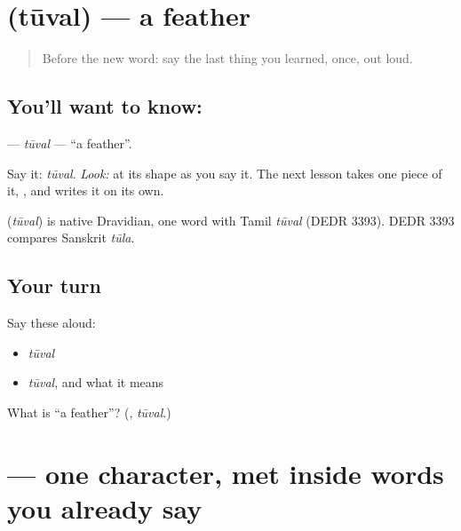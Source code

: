 \section[\texorpdfstring{\ml{തൂവൽ} (tūval)}{തൂവൽ (tūval)}]{ (tūval) — a feather}

\label{lesson:ML-C05-thooval}



\begin{quote}
Before the new word: say the last thing you learned, once, out loud.
\end{quote}

\subsection*{You'll want to know: }
\textbf{} — \emph{tūval} — \textquotedblleft{}a feather\textquotedblright{}.

Say it: \emph{tūval}. \emph{Look:} at its shape as you say it. The next lesson takes one piece of it, \textbf{}, and writes it on its own.

\begin{cousinweb}
\textbf{} (\emph{tūval}) is native Dravidian, one word with Tamil \emph{tūval} (DEDR 3393). DEDR 3393 compares Sanskrit \emph{tūla}.
\end{cousinweb}

\subsection*{Your turn}
Say these aloud:

\begin{itemize}
\raggedright
  \item \emph{tūval}
  \item \emph{tūval}, and what it means
\end{itemize}

\begin{tcolorbox}[breakable,colback=teal!4,colframe=teal!35!black,title={Before you move on}]
What is \textquotedblleft{}a feather\textquotedblright{}? (\textbf{}, \emph{tūval}.)
\end{tcolorbox}
\section[\texorpdfstring{\ml{ൽ} (l)}{ൽ (l)}]{ — one character, met inside words you already say}

\label{lesson:ML-S144-chillu-l}



